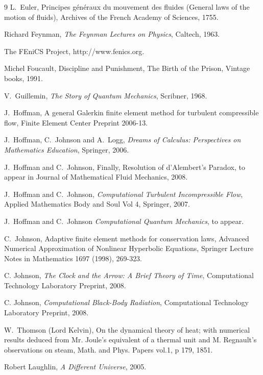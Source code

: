 \begin{thebibliography}{9}
 L.~Euler, Principes g\'en\'eraux du mouvement des fluides 
(General laws of the motion of fluids), Archives of the French Academy 
of Sciences, 1755.

 Richard Feynman, \emph{The Feynman Lectures on Physics},
Caltech, 1963.

 The FEniCS Project, http://www.fenics.org.

 Michel Foucault, Discipline and Punishment, The Birth
of the Prison, Vintage books, 1991.

 V.~Guillemin, \emph{The Story of Quantum Mechanics}, 
Scribner, 1968.


J.~Hoffman, A general Galerkin finite element
method for turbulent compressible flow, Finite Element Center
Preprint 2006-13.

J.~Hoffman, C.~Johnson and A.~Logg, 
\emph{Dreams of Calculus: Perspectives on Mathematics Education}, Springer, 2006. 

J.~Hoffman and C.~Johnson, 
Finally, Resolution of d'Alembert's Paradox, to appear in  
Journal of Mathematical Fluid Mechanics, 2008.


J.~Hoffman and C.~Johnson, 
\emph{Computational Turbulent Incompressible Flow}, Applied Mathematics
Body and Soul Vol 4, Springer, 2007.


 J.~Hoffman and C.~Johnson
\emph{Computational Quantum Mechanics}, to appear.

 C.~Johnson, Adaptive finite element methods for conservation
laws, Advanced Numerical Approximation of Nonlinear Hyperbolic Equations,
Springer Lecture Notes in Mathematics 1697 (1998), 269-323.

 C. Johnson, \emph{The Clock 
and the Arrow: A Brief Theory of Time}, Computational Technology
Laboratory Preprint, 2008.


 C. Johnson, \emph{Computational Black-Body
Radiation},  Computational Technology
Laboratory Preprint, 2008.

W.~Thomson (Lord Kelvin), On the dynamical theory of heat; with numerical 
results deduced from Mr. Joule's equivalent of a thermal unit and M. 
Regnault's observations on steam, Math. and Phys. Papers vol.1, p 179, 1851.

 Robert Laughlin, \emph{A Different Universe}, 2005.


\end{thebibliography}
